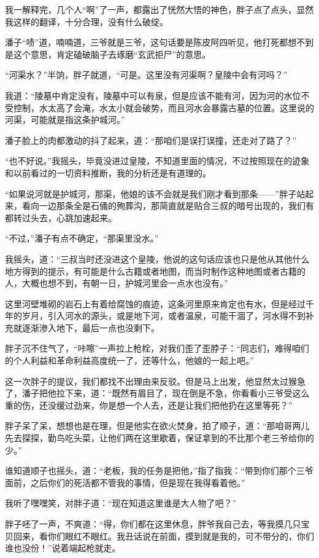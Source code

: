 我一解释完，几个人“啊”了一声，都露出了恍然大悟的神色，胖子点了点头，显然我这样的翻译，十分合理，没有什么破绽。

潘子“啧”道，喃喃道，三爷就是三爷，这句话要是陈皮阿四听见，他打死都想不到是这个意思，肯定磕破脑子去琢磨“玄武拒尸”的意思。

“河渠水？”半饷，胖子就道，“可是。这里没有河渠啊？皇陵中会有河吗？”

我道：“陵墓中肯定没有，陵墓中可以有泉，但是应该不能有河，因为河的水位不受控制，水太高了会淹，水太小就会破势，而且河水会暴露古墓的位置。这里说的河渠，可能就是指这条护城河。”

潘子脸上的肉都激动的抖了起来，道：“那咱们是误打误撞，还走对了路了？”

“也不好说。”我摇头，毕竟没进过皇陵，不知道里面的情况，不过按照现在的迹象和以前看过的一切资料推断，我的分析还是有道理的。

“如果说河就是护城河，那渠，他娘的该不会就是我们刚才看到那条——”胖子站起来，看向一边那条全是石俑的殉葬沟，那简直就是贴合三叔的暗号出现的，我们有都转过头去，心跳加速起来。

“不过，”潘子有点不确定，“那渠里没水。”

我摇头，道：“三叔当时还没进这个皇陵，他说的这句话应该也只是他从其他什么地方得到的提示，有可能是什么古籍或者地图，而当时制作这种地图或者古籍的人，大概也想不到，有朝一日，护城河里会一点水也没有。”

这里河壁堆砌的岩石上有着给腐蚀的痕迹，这条河里原来肯定也有水，但是经过千年的岁月，引入河水的源头，或是地下河，或者温泉，可能干涸了，河水得不到补充就逐渐渗入地下，最后一点也没剩下。

胖子沉不住气了，“咔嚓”一声拉上枪栓，对我们歪了歪脖子：“同志们，难得咱们的个人利益和革命利益高度统一了，还等什么，他娘的一起上吧。”

这一次胖子的提议，我们都找不出理由来反驳。但是马上出发，他显然太过猴急了，潘子把他拉下来，道：“既然有眉目了，现在倒是不急，你看看小三爷受这么重的伤，还没缓过劲来，你是想一个人去，还是让我们把他扔在这里等死？”

胖子呆了呆，想想也是在理，但是他实在欲火焚身，拍了顺子，道：“那咱哥两儿先去探探，勤鸟吃头菜，让他们两在这里歇着，保证拿到的不比那个老三爷给你的少。”

谁知道顺子也摇头，道：“老板，我的任务是把他，”指了指我：“带到你们那个三爷面前，之后你们的死活都不管我的事情，但是现在我得看着他。”

我听了嘿嘿笑，对胖子道：“现在知道这里谁是大人物了吧？”

胖子呸了一声，不爽道：“得，你们都在这里休息，胖爷我自己去，等我摸几只宝贝回来，看你们眼红不眼红。我丑话说在前面，摸到就是我的，可不带分的，你们谁也没份！”说着端起枪就走。

